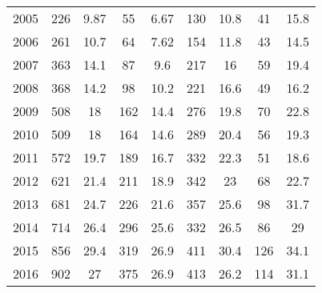 \begin{table}[htbp]
\begin{tabular}{l*{8}{c}}
2005      &      226&     9.87&       55&     6.67&      130&     10.8&       41&     15.8\\
2006      &      261&     10.7&       64&     7.62&      154&     11.8&       43&     14.5\\
2007      &      363&     14.1&       87&      9.6&      217&       16&       59&     19.4\\
2008      &      368&     14.2&       98&     10.2&      221&     16.6&       49&     16.2\\
2009      &      508&       18&      162&     14.4&      276&     19.8&       70&     22.8\\
2010      &      509&       18&      164&     14.6&      289&     20.4&       56&     19.3\\
2011      &      572&     19.7&      189&     16.7&      332&     22.3&       51&     18.6\\
2012      &      621&     21.4&      211&     18.9&      342&       23&       68&     22.7\\
2013      &      681&     24.7&      226&     21.6&      357&     25.6&       98&     31.7\\
2014      &      714&     26.4&      296&     25.6&      332&     26.5&       86&       29\\
2015      &      856&     29.4&      319&     26.9&      411&     30.4&      126&     34.1\\
2016      &      902&       27&      375&     26.9&      413&     26.2&      114&     31.1\\
\hline\hline
\end{tabular}
\end{table}
